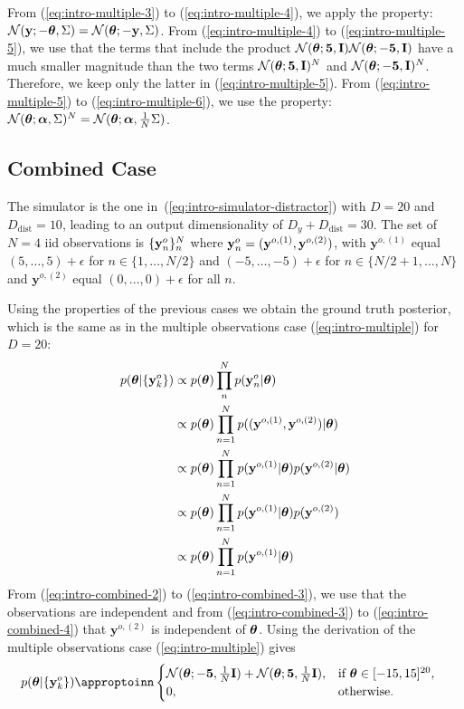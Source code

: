 From (\ref{eq:intro-multiple-3}) to (\ref{eq:intro-multiple-4}), we apply the property: $\mathcal{N}(\mathbf{y}; - \boldsymbol{\theta}, \Sigma) = \mathcal{N}(\boldsymbol{\theta}; - \mathbf{y} , \Sigma)$.
From (\ref{eq:intro-multiple-4}) to (\ref{eq:intro-multiple-5}), we use that the terms that include the product
$\mathcal{N}(\boldsymbol{\theta}; \mathbf{5}, \mathbf{I})\mathcal{N}(\boldsymbol{\theta}; - \mathbf{5}, \mathbf{I})$ have a much smaller magnitude than the two terms
$\mathcal{N}(\boldsymbol{\theta}; \mathbf{5}, \mathbf{I})^N$ and $\mathcal{N}(\boldsymbol{\theta}; - \mathbf{5}, \mathbf{I})^N$. Therefore, we keep only the latter in (\ref{eq:intro-multiple-5}).
From (\ref{eq:intro-multiple-5}) to (\ref{eq:intro-multiple-6}), we use the property: $\mathcal{N}(\boldsymbol{\theta}; \boldsymbol{\alpha}, \Sigma)^N = \mathcal{N}(\boldsymbol{\theta}; \boldsymbol{\alpha}, \frac{1}{N}\Sigma)$.

\subsection{Combined Case}
The simulator is the one in~(\ref{eq:intro-simulator-distractor}) with $D = 20$ and $D_{\text{dist}} = 10$, leading to an output dimensionality of $D_y + D_{\text{dist}} = 30$.
The set of $N=4$ iid observations is $\{\mathbf{y}^o_n\}_n^N$ where $\mathbf{y}^o_n = (\mathbf{y}^{o,(1)}, \mathbf{y}^{o,(2)})$, with $\mathbf{y}^{o,(1)}$ equal $(5, \ldots, 5) + \epsilon$ for $n \in \{1, \ldots, N/2\}$ and $(-5, \ldots, -5) + \epsilon$ for $n \in \{N/2+1, \ldots, N\}$ and $\mathbf{y}^{o,(2)}$ equal $(0, \ldots, 0) + \epsilon$ for all $n$.

Using the properties of the previous cases we obtain the ground truth posterior, which is the same as in the multiple observations case (\ref{eq:intro-multiple}) for $D = 20$:
%
\begin{align}
  p(\boldsymbol{\theta}|\{\mathbf{y}^o_k\})
  &\propto p(\boldsymbol{\theta}) \prod_n^{N} p(\mathbf{y}^o_n | \boldsymbol{\theta}) \label{eq:intro-combined-1} \\
  &\propto p(\boldsymbol{\theta}) \prod_{n=1}^{N} p((\mathbf{y}^{o,(1)}, \mathbf{y}^{o,(2)}) | \boldsymbol{\theta}) \label{eq:intro-combined-2} \\
  &\propto p(\boldsymbol{\theta}) \prod_{n=1}^N p(\mathbf{y}^{o,(1)} | \boldsymbol{\theta}) p(\mathbf{y}^{o,(2)} | \boldsymbol{\theta}) \label{eq:intro-combined-3} \\
  &\propto p(\boldsymbol{\theta}) \prod_{n=1}^N p(\mathbf{y}^{o,(1)} | \boldsymbol{\theta}) p(\mathbf{y}^{o,(2)}) \label{eq:intro-combined-4} \\
  &\propto p(\boldsymbol{\theta}) \prod_{n=1}^N p(\mathbf{y}^{o,(1)} | \boldsymbol{\theta}) \label{eq:intro-combined-5}
  \end{align}
From (\ref{eq:intro-combined-2}) to (\ref{eq:intro-combined-3}), we use that the observations are independent and
from (\ref{eq:intro-combined-3}) to (\ref{eq:intro-combined-4}) that $\mathbf{y}^{o,(2)}$ is independent of $\boldsymbol{\theta}$.
Using the derivation of the multiple observations case (\ref{eq:intro-multiple}) gives
  \begin{align}
  p(\thb|\{\data_k\})
  &\appropto
  \begin{cases}
    \mathcal{N}(\thb; - \mathbf{5}, \frac{1}{N}\mathbf{I} ) + \mathcal{N}(\thb; \mathbf{5}, \frac{1}{N}\mathbf{I} ), & \text{if } \thb \in [-15, 15]^{20}, \\
    0, & \text{otherwise}.
  \end{cases}
  \label{eq:intro-combined}
\end{align}


